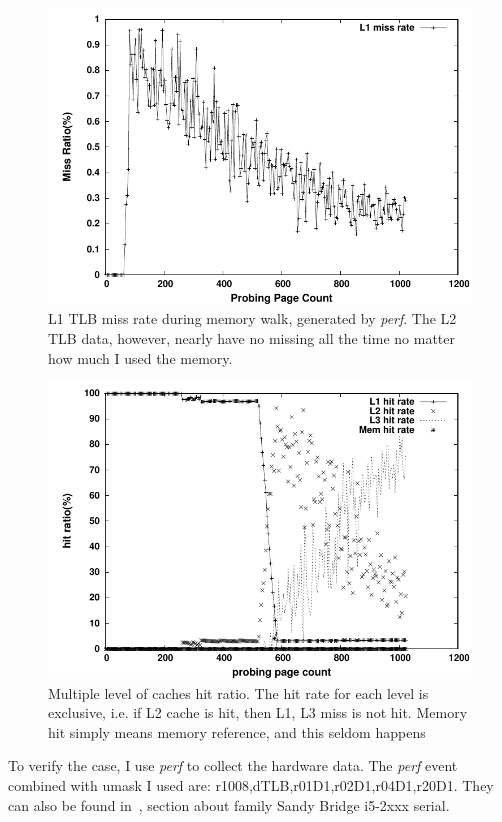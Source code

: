 \begin{figure}[hpb]
\centering
\includegraphics[width=0.8\linewidth]{../figures/tlb}
\caption{L1 TLB miss rate during memory walk, generated by \emph{perf}. The L2 TLB data, however, nearly have no missing all the time no matter how much I used the memory.
}
\label{fig:tlbsz-tlb}
\end{figure}

\begin{figure}[htp]
\centering
\includegraphics[width=0.8\linewidth]{../figures/cache}
\caption{Multiple level of caches hit ratio. The hit rate for each level is exclusive, i.e. if L2 cache is hit, then L1, L3 miss is not hit. Memory hit simply means memory reference, and this seldom happens}
\label{fig:tlbsz-cache}
\end{figure}

To verify the case, I use \emph{perf} to collect the hardware data. The \emph{perf}
event combined with umask I used are: r1008,dTLB,r01D1,r02D1,r04D1,r20D1. They can
also be found in~\cite{intel-dev3}, section about family Sandy Bridge i5-2xxx serial.

